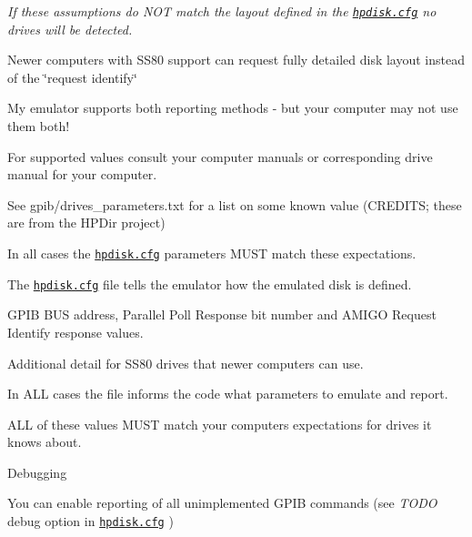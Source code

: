 \begin{DoxyItemize}
\begin{DoxyItemize}
\begin{DoxyItemize}
\begin{DoxyItemize}
\item {\itshape If these assumptions do N\+OT match the layout defined in the \href{sdcard/sdcard.cfg}{\tt hpdisk.\+cfg} no drives will be detected.}
\end{DoxyItemize}
\end{DoxyItemize}
\item Newer computers with S\+S80 support can request fully detailed disk layout instead of the \char`\"{}request identify\char`\"{}
\item My emulator supports both reporting methods -\/ but your computer may not use them both!
\begin{DoxyItemize}
\item For supported values consult your computer manuals or corresponding drive manual for your computer.
\begin{DoxyItemize}
\item See gpib/drives\+\_\+parameters.\+txt for a list on some known value (C\+R\+E\+D\+I\+TS; these are from the H\+P\+Dir project)
\end{DoxyItemize}
\item In all cases the \href{sdcard/hpdisk.cfg}{\tt hpdisk.\+cfg} parameters M\+U\+ST match these expectations.
\end{DoxyItemize}
\item The \href{sdcard/hpdisk.cfg}{\tt hpdisk.\+cfg} file tells the emulator how the emulated disk is defined.
\begin{DoxyItemize}
\item G\+P\+IB B\+US address, Parallel Poll Response bit number and A\+M\+I\+GO Request Identify response values.
\item Additional detail for S\+S80 drives that newer computers can use.
\item In A\+LL cases the file informs the code what parameters to emulate and report.
\begin{DoxyItemize}
\item A\+LL of these values M\+U\+ST match your computers expectations for drives it knows about.
\end{DoxyItemize}
\end{DoxyItemize}
\item Debugging
\begin{DoxyItemize}
\item You can enable reporting of all unimplemented G\+P\+IB commands (see {\itshape T\+O\+DO} debug option in \href{sdcard/hpdisk.cfg}{\tt hpdisk.\+cfg} )
\begin{DoxyItemize}

\end{DoxyItemize}
\end{DoxyItemize}
\end{DoxyItemize}
\end{DoxyItemize}
